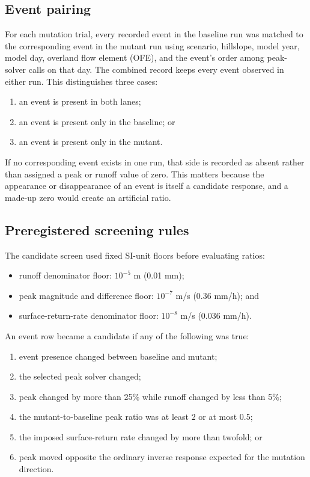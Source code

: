 \documentclass[11pt]{article}
\begin{document}
\subsection{Event pairing}

For each mutation trial, every recorded event in the baseline run was matched
to the corresponding event in the mutant run using scenario, hillslope, model
year, model day, overland flow element (OFE), and the event's order among
peak-solver calls on that day. The combined record keeps every event observed
in either run. This distinguishes three cases:

\begin{enumerate}
  \item an event is present in both lanes;
  \item an event is present only in the baseline; or
  \item an event is present only in the mutant.
\end{enumerate}

If no corresponding event exists in one run, that side is recorded as absent
rather than assigned a peak or runoff value of zero. This matters because the
appearance or disappearance of an event is itself a candidate response, and a
made-up zero would create an artificial ratio.

\subsection{Preregistered screening rules}

The candidate screen used fixed SI-unit floors before evaluating ratios:

\begin{itemize}
  \item runoff denominator floor: $10^{-5}$ m (0.01 mm);
  \item peak magnitude and difference floor: $10^{-7}$ m/s
    (0.36 mm/h); and
  \item surface-return-rate denominator floor: $10^{-8}$ m/s
    (0.036 mm/h).
\end{itemize}

An event row became a candidate if any of the following was true:

\begin{enumerate}
  \item event presence changed between baseline and mutant;
  \item the selected peak solver changed;
  \item peak changed by more than 25\% while runoff changed by less than 5\%;
  \item the mutant-to-baseline peak ratio was at least 2 or at most 0.5;
  \item the imposed surface-return rate changed by more than twofold; or
  \item peak moved opposite the ordinary inverse response expected for the
    mutation direction.
\end{enumerate}
\end{document}

